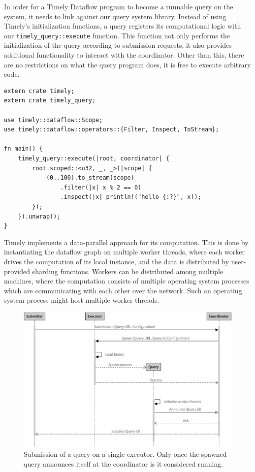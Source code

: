 In order for a Timely Dataflow program to become a runnable query on the system,
it needs to link against our query system library. Instead of using Timely's 
initialization functions, a query registers its computational logic with our
\lstinline{timely_query::execute} function.
This function not only performs the initialization of the query according
to submission requests, it also provides additional functionality to interact
with the coordinator. Other than this, there are no restrictions on what the
query program does, it is free to execute arbitrary code.

\begin{lstlisting}[caption={[Example query.]Example query which creates a stream of integers,
filters out all odd numbers and then prints the rest.}]
extern crate timely;
extern crate timely_query;

use timely::dataflow::Scope;
use timely::dataflow::operators::{Filter, Inspect, ToStream};

fn main() {
    timely_query::execute(|root, coordinator| {
        root.scoped::<u32, _, _>(|scope| {
            (0..100).to_stream(scope)
                .filter(|x| x % 2 == 0)
                .inspect(|x| println!("hello {:?}", x));
        });
    }).unwrap();
}
\end{lstlisting}



Timely implements a data-parallel approach for its computation. This is done by
instantiating the dataflow graph on multiple worker threads, where each worker
drives the computation of its local instance, and the data is distributed by
user-provided sharding functions. Workers can be distributed among multiple
machines, where the computation consists of multiple operating system processes
which are communicating with each other over the network. Such an
operating system process might host multiple worker threads.

\begin{figure}[htb]
  \centering
    \includegraphics[width=1\textwidth]{figures/spawn_singleprocess}
  \caption[Query submission with single process.]{Submission of a query on a single executor.
  Only once the spawned query announces itself at the coordinator is it considered running.}
  \label{fig:subsingle}
\end{figure}

